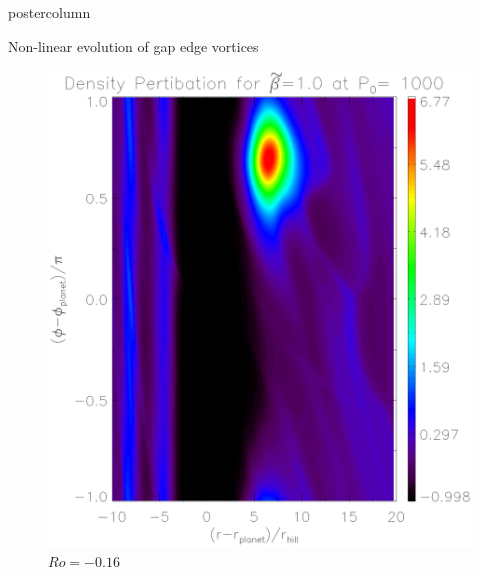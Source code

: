 \documentclass[final,hyperref={pdfpagelabels=false}]{beamer}
\begin{document}
\begin{frame}
\begin{columns}
\begin{column}{.49\textwidth}
\begin{beamercolorbox}[center,wd=\textwidth]{postercolumn}
\begin{minipage}[T]{.95\textwidth}
{            \begin{block}{\Large{Non-linear evolution of gap edge
                  vortices}}
              \justifying


                  \begin{figure}
                    \centering
                    \hfill
                    \begin{minipage}{0.3\textwidth}
                      \includegraphics[width=\textwidth]{Posterfig_Before}
                      \caption{$Ro=-0.16$}
                    \end{minipage}
                    \hfill
                    \begin{minipage}{0.3\textwidth}

\end{minipage}
\end{figure}
\end{block}}
\end{minipage}
\end{beamercolorbox}
\end{column}
\end{columns}
\end{frame}
\end{document}
